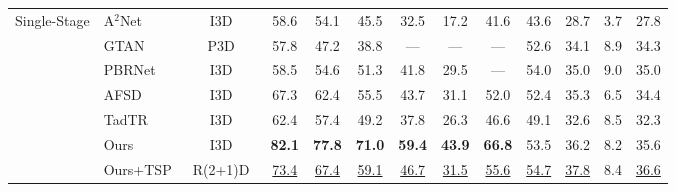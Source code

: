 \begin{table}[t]
{\begin{tabular}{c|l|c|cccccc|cccc}
    \hline
     \multirow{7}{*}{Single-Stage} %
     & A$^2$Net~\cite{a2nettip2020} & I3D~\cite{kinetics2017cvpr} & 58.6 &54.1& 45.5 &32.5& 17.2 & 41.6 & 43.6 & 28.7 & 3.7 & 27.8 \tabularnewline \cline{4-13}
     & GTAN~\cite{gaussiancvpr2019} & P3D~\cite{qiu2017learning} & 57.8 & 47.2 & 38.8 & --- & --- & ---  & {52.6} & 34.1 & 8.9 & 34.3 \tabularnewline \cline{4-13}
    & PBRNet~\cite{liu2020progressive} & I3D~\cite{kinetics2017cvpr} & 58.5 & 54.6 & 51.3 & 41.8 & 29.5 & --- & 54.0 & 35.0 & 9.0 & 35.0 \tabularnewline \cline{4-13}
    & AFSD~\cite{afsdcvpr2021} & I3D~\cite{kinetics2017cvpr} & 67.3 & 62.4 & 55.5 & 43.7 & 31.1 & 52.0 & 52.4 & 35.3 & 6.5 & 34.4 \tabularnewline \cline{4-13}
    & TadTR~\cite{tadtrarxiv2021} & I3D~\cite{kinetics2017cvpr} & 62.4 & 57.4 & 49.2 & 37.8 & 26.3 & 46.6 & 49.1 & 32.6 & 8.5 & 32.3 \tabularnewline \cline{4-13}
   & Ours & I3D~\cite{kinetics2017cvpr} & \textbf{82.1} & \textbf{77.8} & \textbf{71.0} & \textbf{59.4} & \textbf{43.9} & \textbf{66.8} & 53.5 & 36.2 & 8.2 & 35.6 \tabularnewline \cline{4-13}
   & Ours+TSP~\cite{tspiccvworkshop2021} & R(2+1)D~\cite{res2p1d2018cvpr} & \underline{73.4} & \underline{67.4} & \underline{59.1} & \underline{46.7} & \underline{31.5} & \underline{55.6} & \underline{54.7} & \underline{37.8} & 8.4 & \underline{36.6} \tabularnewline %
  \end{tabular}
 }
\end{table}